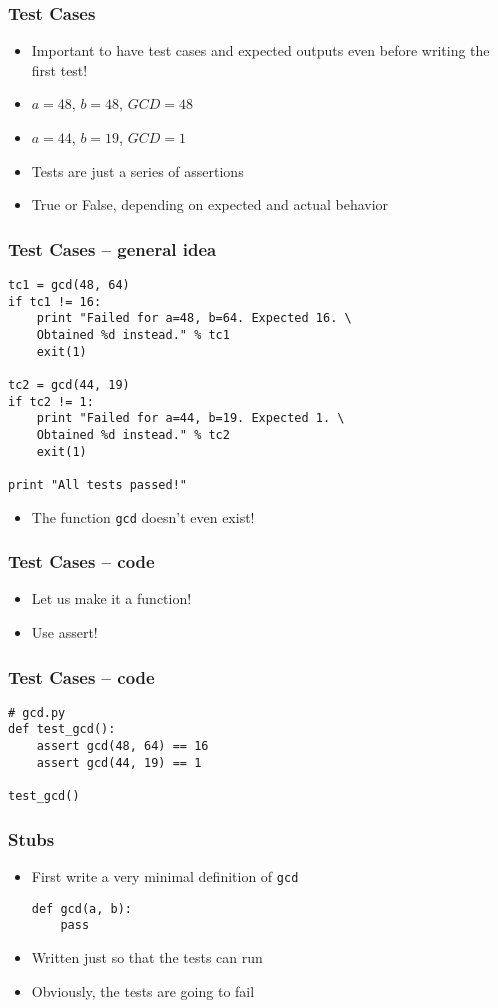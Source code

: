 \documentclass[14pt,compress]{beamer}
\begin{document}
\begin{frame}[fragile]
  \frametitle{Test Cases}
  \begin{itemize}
  \item Important to have test cases and expected outputs even before
    writing the first test!
  \item $a=48$, $b=48$, $GCD=48$
  \item $a=44$, $b=19$, $GCD=1$
  \item Tests are just a series of assertions
  \item True or False, depending on expected and actual behavior
  \end{itemize}

\end{frame}

\begin{frame}[fragile]
  \frametitle{Test Cases -- general idea}
  \small
\begin{lstlisting}
tc1 = gcd(48, 64)
if tc1 != 16:
    print "Failed for a=48, b=64. Expected 16. \
    Obtained %d instead." % tc1
    exit(1)

tc2 = gcd(44, 19)
if tc2 != 1:
    print "Failed for a=44, b=19. Expected 1. \
    Obtained %d instead." % tc2
    exit(1)

print "All tests passed!"
\end{lstlisting}
\begin{itemize}
\item The function \texttt{gcd} doesn't even exist!
\end{itemize}
\end{frame}

\begin{frame}[fragile]
  \frametitle{Test Cases -- code}
  \begin{itemize}
      \item Let us make it a function!
      \item Use assert!
  \end{itemize}
\end{frame}

\begin{frame}[fragile]
  \frametitle{Test Cases -- code}
\begin{lstlisting}
# gcd.py
def test_gcd():
    assert gcd(48, 64) == 16
    assert gcd(44, 19) == 1

test_gcd()
\end{lstlisting}
\end{frame}

\begin{frame}[fragile]
  \frametitle{Stubs}
  \begin{itemize}
  \item First write a very minimal definition of \texttt{gcd}
    \begin{lstlisting}
def gcd(a, b):
    pass
    \end{lstlisting}
  \item Written just so that the tests can run
  \item Obviously, the tests are going to fail
  \end{itemize}
\end{frame}
\end{document}
